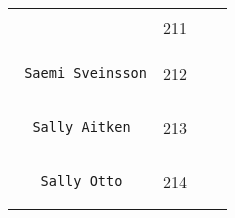 \documentclass[]{article}
\begin{document}
\begin{longtable}[c]{@{}llll@{}}
\begin{minipage}[t]{0.39\columnwidth}
\begin{verbatim}
\end{verbatim}
\end{minipage} & \begin{minipage}[t]{0.10\columnwidth}\raggedright
211
\end{minipage} & \begin{minipage}[t]{0.13\columnwidth}\raggedright
\end{minipage} & \begin{minipage}[t]{0.15\columnwidth}\raggedright
\end{minipage}
\\\noalign{\medskip}
\begin{minipage}[t]{0.39\columnwidth}\raggedright
\begin{verbatim}
 Saemi Sveinsson
\end{verbatim}
\end{minipage} & \begin{minipage}[t]{0.10\columnwidth}\raggedright
212
\end{minipage} & \begin{minipage}[t]{0.13\columnwidth}\raggedright
\end{minipage} & \begin{minipage}[t]{0.15\columnwidth}\raggedright
\end{minipage}
\\\noalign{\medskip}
\begin{minipage}[t]{0.39\columnwidth}\raggedright
\begin{verbatim}
  Sally Aitken
\end{verbatim}
\end{minipage} & \begin{minipage}[t]{0.10\columnwidth}\raggedright
213
\end{minipage} & \begin{minipage}[t]{0.13\columnwidth}\raggedright
\end{minipage} & \begin{minipage}[t]{0.15\columnwidth}\raggedright
\end{minipage}
\\\noalign{\medskip}
\begin{minipage}[t]{0.39\columnwidth}\raggedright
\begin{verbatim}
   Sally Otto
\end{verbatim}
\end{minipage} & \begin{minipage}[t]{0.10\columnwidth}\raggedright
214
\end{minipage} & \begin{minipage}[t]{0.13\columnwidth}\raggedright

\end{minipage}
\end{longtable}
\end{document}
